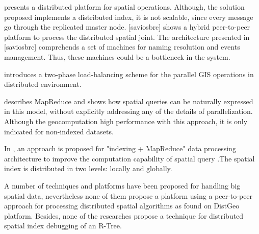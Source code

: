 \cite{dedsi} presents a distributed platform for spatial operations. Although, the solution proposed implements a distributed index, it is not scalable, since every message go through the replicated master node. [saviosbrc] shows a hybrid peer-to-peer platform to process the distributed spatial joint. The architecture presented in [saviosbrc] comprehends a set of machines for naming resolution and events management. Thus, these machines could be a bottleneck in the system.    

\cite{xie2008two} introduces a two-phase load-balancing scheme for the parallel GIS operations in distributed environment.

\cite{zhang2009spatial} describes MapReduce and shows how spatial queries can be naturally expressed in this model, without explicitly addressing any of the details of parallelization. Although the geocomputation high performance with this approach, it is only indicated for non-indexed datasets.

In \cite{zhong2012towards}, an approach is proposed for "indexing + MapReduce" data processing architecture to improve the computation capability of spatial query .The spatial index is distributed in two levels: locally and globally.

A number of techniques and platforms have been proposed for handling big spatial data, nevertheless  none of them propose a platform using a peer-to-peer approach for processing distributed spatial algorithms as found on DistGeo platform. Besides, none of the researches propose a technique for distributed spatial index debugging of an R-Tree.